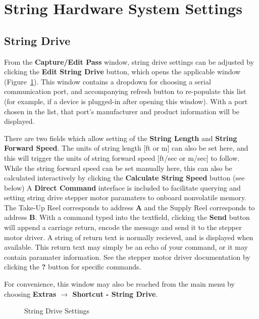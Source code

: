 \documentclass[10pt,letterpaper,titlepage]{article}
\begin{document}
    \newpage

    \section{String Hardware System Settings}
    \label{sec:string_hardware_settings}

    \subsection{String Drive}
    From the \textbf{Capture/Edit Pass} window, string drive settings can be adjusted by clicking the \textbf{Edit String Drive} button, which opens the applicable window (Figure~\ref{fig:string_drive_settings}). This window contains a dropdown for choosing a serial communication port, and accompanying refresh button to re-populate this list (for example, if a device is plugged-in after opening this window). With a port chosen in the list, that port's manufacturer and product information will be displayed.\par
    There are two fields which allow setting of the \textbf{String Length} and \textbf{String Forward Speed}. The units of string length [ft or m] can also be set here, and this will trigger the units of string forward speed [ft/sec or m/sec] to follow. While the string forward speed can be set manually here, this can also be calculated interactively by clicking the \textbf{Calculate String Speed} button (see below) 
    A \textbf{Direct Command} interface is included to facilitate querying and setting string drive stepper motor paramaters to onboard nonvolatile memory. The Take-Up Reel corresponds to address \textbf{A} and the Supply Reel corresponds to address \textbf{B}. With a command typed into the textfield, clicking the \textbf{Send} button will append a carriage return, encode the message and send it to the stepper motor driver. A string of return text is normally recieved, and is displayed when available. This return text may simply be an echo of your command, or it may contain paramater information. See the stepper motor driver documentation by clicking the \textbf{?} button for specific commands.\par
    For convenience, this window may also be reached from the main menu by choosing \textbf{Extras $\rightarrow$ Shortcut - String Drive}.
    \begin{figure}[hb]
        \centering
        \caption{String Drive Settings}
        \label{fig:string_drive_settings}
    \end{figure}
    \newpage
    
\end{document}
